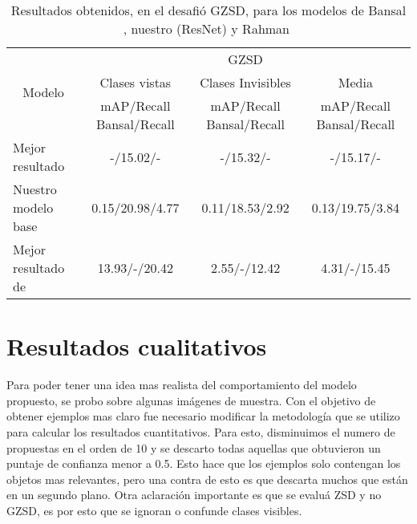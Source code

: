 \begin{table}[]
	\centering
	\resizebox{12.5cm}{1.2cm} {
	\begin{tabular}{|l|c|c|c|}
		\hline
		\multicolumn{1}{|c|}{\multirow{3}{*}{Modelo}} & \multicolumn{3}{c|}{GZSD}                                                       \\ \cline{2-4} 
		\multicolumn{1}{|c|}{}                        & Clases vistas             & Clases Invisibles        & Media                    \\ \cline{2-4} 
		\multicolumn{1}{|c|}{}                        & mAP/Recall Bansal/Recall  & mAP/Recall Bansal/Recall & mAP/Recall Bansal/Recall \\ \hline
		Mejor resultado \cite{bansal2018zero}                                        & -/15.02/-                 & -/15.32/-                & -/15.17/-                \\ \hline
		Nuestro modelo base                              & 0.15/20.98/4.77           & 0.11/18.53/2.92          & 0.13/19.75/3.84           \\ \hline
		Mejor resultado de \cite{rahman2020zero}     & 13.93/-/20.42             & 2.55/-/12.42             & 4.31/-/15.45             \\ \hline
	\end{tabular}
	}
	\caption{Resultados obtenidos, en el desafió GZSD, para los modelos de Bansal \etal~\cite{bansal2018zero}, nuestro (ResNet) y Rahman \etal~\cite{rahman2020zero}}
	\label{tab:resultados-gzsd}
\end{table}
\newpage

\section{Resultados cualitativos} \label{sec:resultadoscualitativos}

Para poder tener una idea mas realista del comportamiento del modelo propuesto, se probo sobre algunas imágenes de muestra. Con el objetivo de obtener ejemplos mas claro fue necesario modificar la metodología que se utilizo para calcular los resultados cuantitativos. Para esto, disminuimos el numero de propuestas en el orden de 10 y se descarto todas aquellas que obtuvieron un puntaje de confianza menor a 0.5. Esto hace que los ejemplos solo contengan los objetos mas relevantes, pero una contra de esto es que descarta muchos que están en un segundo plano. Otra aclaración importante es que se evaluá ZSD y no GZSD, es por esto que se ignoran o confunde clases visibles. 

